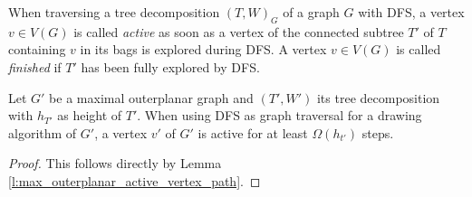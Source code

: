 \begin{definition}
	When traversing a tree decomposition $(T,W)_G$ of a graph $G$ with DFS, a vertex $v\in V(G)$ is called \emph{active} as soon as a vertex of the connected subtree $T'$ of $T$ containing $v$ in its bags is explored during DFS. A vertex $v\in V(G)$ is called \emph{finished} if $T'$ has been fully explored by DFS.
\end{definition}

\begin{lemma}
	Let $G'$ be a maximal outerplanar graph and $(T',W')$ its tree decomposition with $h_{T'}$ as height of $T'$. When using DFS as graph traversal for a drawing algorithm of $G'$, a vertex $v'$ of $G'$ is active for at least $\Omega(h_{t'})$ steps.\label{l:one_vertex_active_height}
\end{lemma}
\begin{proof}
	This follows directly by Lemma \ref{l:max_outerplanar_active_vertex_path}.
\end{proof}

